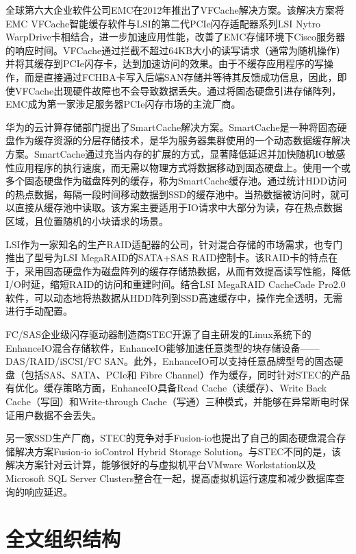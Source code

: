 全球第六大企业软件公司EMC在2012年推出了VFCache解决方案\cite{vfcache}。该解决方案将EMC VFCache智能缓存软件与LSI的第二代PCIe闪存适配器系列LSI Nytro WarpDrive卡相结合，进一步加速应用性能，改善了EMC存储环境下Cisco服务器的响应时间。VFCache通过拦截不超过64KB大小的读写请求（通常为随机操作）并将其缓存到PCIe闪存卡，达到加速访问的效果。由于不缓存应用程序的写操作，而是直接通过FCHBA卡写入后端SAN存储并等待其反馈成功信息，因此，即使VFCache出现硬件故障也不会导致数据丢失。通过将固态硬盘引进存储阵列，EMC成为第一家涉足服务器PCIe闪存市场的主流厂商。

华为的云计算存储部门提出了SmartCache解决方案\cite{smartcache}。SmartCache是一种将固态硬盘作为缓存资源的分层存储技术，是华为服务器集群使用的一个动态数据缓存解决方案。SmartCache通过充当内存的扩展的方式，显著降低延迟并加快随机IO敏感性应用程序的执行速度，而无需以物理方式将数据移动到固态硬盘上。使用一个或多个固态硬盘作为磁盘阵列的缓存，称为SmartCache缓存池。通过统计HDD访问的热点数据，每隔一段时间移动数据到SSD的缓存池中。当热数据被访问时，就可以直接从缓存池中读取。该方案主要适用于IO请求中大部分为读，存在热点数据区域，且位置随机的小块请求的场景。

LSI作为一家知名的生产RAID适配器的公司，针对混合存储的市场需求，也专门推出了型号为LSI MegaRAID的SATA+SAS RAID控制卡。该RAID卡的特点在于，采用固态硬盘作为磁盘阵列的缓存存储热数据，从而有效提高读写性能，降低I/O时延，缩短RAID的访问和重建时间。结合LSI MegaRAID CacheCade Pro2.0软件\cite{lsiraidcache}，可以动态地将热数据从HDD阵列到SSD高速缓存中，操作完全透明，无需进行手动配置。

FC/SAS企业级闪存驱动器制造商STEC开源了自主研发的Linux系统下的EnhanceIO混合存储软件\cite{enhanceio}，EnhanceIO能够加速任意类型的块存储设备——DAS/RAID/iSCSI/FC SAN。此外，EnhanceIO可以支持任意品牌型号的固态硬盘（包括SAS、SATA、PCIe和 Fibre Channel）作为缓存，同时针对STEC的产品有优化。缓存策略方面，EnhanceIO具备Read Cache（读缓存）、Write Back Cache（写回）和Write-through Cache（写通）三种模式，并能够在异常断电时保证用户数据不会丢失。

另一家SSD生产厂商，STEC的竞争对手Fusion-io也提出了自己的固态硬盘混合存储解决方案Fusion-io ioControl Hybrid Storage Solution\cite{fusionio}。与STEC不同的是，该解决方案针对云计算，能够很好的与虚拟机平台VMware Workstation以及Microsoft SQL Server Clusters整合在一起，提高虚拟机运行速度和减少数据库查询的响应延迟。

\section{全文组织结构}
\label{sec:organization}

